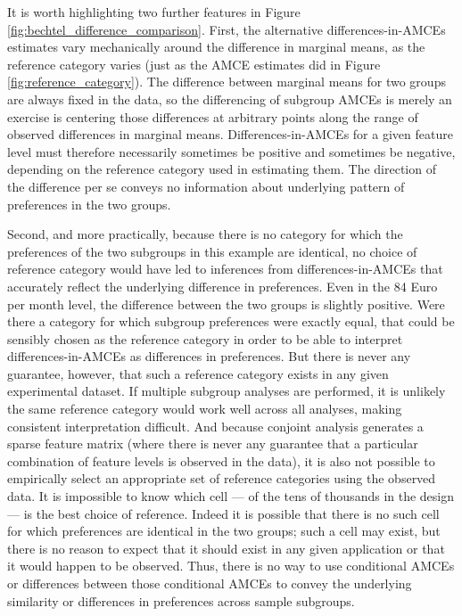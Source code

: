 \documentclass[a4paper,12pt]{article}\usepackage[]{graphicx}\usepackage[]{color}
\begin{document}
It is worth highlighting two further features in Figure \ref{fig:bechtel_difference_comparison}. First, the alternative differences-in-AMCEs estimates vary mechanically around the difference in marginal means, as the reference category varies (just as the AMCE estimates did in Figure \ref{fig:reference_category}). The difference between marginal means for two groups are always fixed in the data, so the differencing of subgroup AMCEs is merely an exercise is centering those differences at arbitrary points along the range of observed differences in marginal means. Differences-in-AMCEs for a given feature level must therefore necessarily sometimes be positive and sometimes be negative, depending on the reference category used in estimating them. The direction of the difference per se conveys no information about underlying pattern of preferences in the two groups. 

Second, and more practically, because there is no category for which the preferences of the two subgroups in this example are identical, no choice of reference category would have led to inferences from differences-in-AMCEs that accurately reflect the underlying difference in preferences. Even in the 84 Euro per month level, the difference between the two groups is slightly positive. Were there a category for which subgroup preferences were exactly equal, that could be sensibly chosen as the reference category in order to be able to interpret differences-in-AMCEs as differences in preferences. But there is never any guarantee, however, that such a reference category exists in any given experimental dataset. If multiple subgroup analyses are performed, it is unlikely the same reference category would work well across all analyses, making consistent interpretation difficult. And because conjoint analysis generates a sparse feature matrix (where there is never any guarantee that a particular combination of feature levels is observed in the data), it is also not possible to empirically select an appropriate set of reference categories using the observed data. It is impossible to know which cell --- of the tens of thousands in the design --- is the best choice of reference. Indeed it is possible that there is no such cell for which preferences are identical in the two groups; such a cell may exist, but there is no reason to expect that it should exist in any given application or that it would happen to be observed. Thus, there is no way to use conditional AMCEs or differences between those conditional AMCEs to convey the underlying similarity or differences in preferences across sample subgroups.
\end{document}
